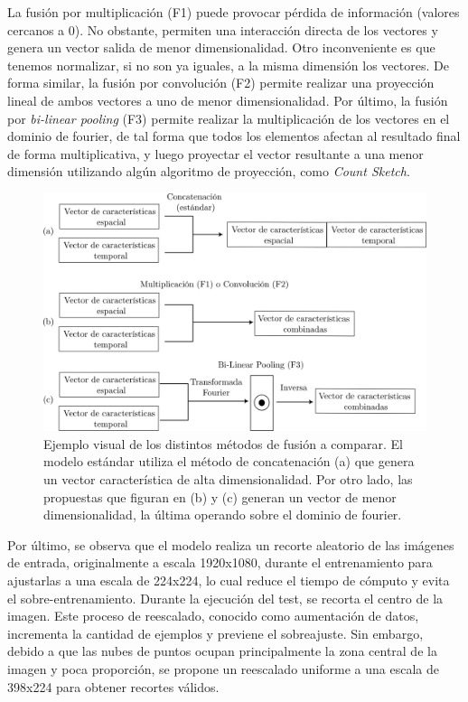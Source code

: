 La fusión por multiplicación (F1) puede provocar pérdida de información (valores cercanos a 0). 
No obstante, permiten una interacción directa de los vectores y genera un vector salida 
de menor dimensionalidad. Otro inconveniente es que tenemos normalizar, si no son 
ya iguales, a la misma dimensión los vectores. De forma similar, la fusión por convolución (F2)
permite realizar una proyección lineal de ambos vectores a uno de menor dimensionalidad. 
Por último, la fusión por \emph{bi-linear pooling} (F3) permite realizar la multiplicación de 
los vectores en el dominio de fourier, de tal forma que todos los elementos afectan al 
resultado final de forma multiplicativa, y luego proyectar 
el vector resultante a una menor dimensión utilizando algún algoritmo de proyección, 
como \emph{Count Sketch}. 

\begin{figure}[htp]
  \begin{center}
    \includegraphics[width=.8\textwidth]{imagenes/chapter5/FeatureFusionExample}
  \end{center}
  \caption[Ejemplo visual de los distintos métodos de fusión a comparar.]{Ejemplo visual de los distintos métodos de fusión a comparar.
   El modelo estándar utiliza el método de concatenación (a) que genera un vector 
 característica de alta dimensionalidad. 
Por otro lado, las propuestas que figuran en (b) y (c) generan un vector de 
menor dimensionalidad, la última operando sobre el dominio de fourier.
}
  \label{fig:FeatureFusionExample}
\end{figure}

Por último, se observa que el modelo realiza un recorte aleatorio de las imágenes de entrada, 
originalmente a escala 1920x1080, durante el entrenamiento 
para ajustarlas a una escala de 224x224, lo cual reduce el tiempo de cómputo y 
evita el sobre-entrenamiento. Durante la ejecución del test, se recorta el centro de la imagen. 
Este proceso de reescalado, conocido como aumentación de datos, incrementa la cantidad de ejemplos 
y previene el sobreajuste. Sin embargo, debido a que las nubes de puntos ocupan principalmente 
la zona central de la imagen y poca proporción, se propone un reescalado uniforme a una escala de 
398x224 para obtener recortes válidos.

